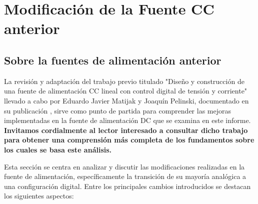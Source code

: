 \chapter{Modificación de la Fuente CC anterior}

\label{C:Sobre la fuente anterior}

\section{Sobre la fuentes de alimentación anterior}
La revisión y adaptación del trabajo previo titulado "Diseño y construcción de una fuente de alimentación CC lineal con control digital de tensión y corriente" llevado a cabo por Eduardo Javier Matijak y Joaquín Pelinski, documentado en su publicación \cite{Fuente2023}, sirve como punto de partida para comprender las mejoras implementadas en la fuente de alimentación DC que se examina en este informe. \textbf{Invitamos cordialmente al lector interesado a consultar dicho trabajo para obtener 
una comprensión más completa de los fundamentos sobre los cuales se basa este análisis.} \par 
Esta sección se centra en analizar y discutir las modificaciones realizadas en la fuente de alimentación, específicamente la transición de su mayoría analógica a una configuración digital. Entre los principales cambios introducidos se destacan los siguientes aspectos:

